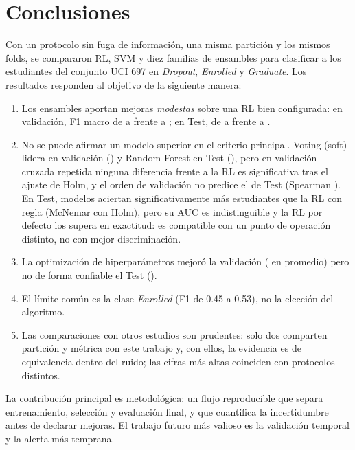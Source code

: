 \documentclass[conference]{IEEEtran}
\newcommand{\cD}{\emph{Dropout}}
\newcommand{\cE}{\emph{Enrolled}}
\newcommand{\cG}{\emph{Graduate}}
\newcommand{\Fm}{F1 macro}
\begin{document}
\section{Conclusiones}\label{sec:conc}
Con un protocolo sin fuga de información, una misma partición y los mismos folds, se compararon RL, SVM y diez familias de ensambles para clasificar a los estudiantes del conjunto UCI 697 en \cD, \cE{} y \cG. Los resultados responden al objetivo de la siguiente manera:
\begin{enumerate}
\item Los ensambles aportan mejoras \emph{modestas} sobre una RL bien configurada: en validación, \Fm{} de \cvFMinOpt{} a \cvFMaxOpt{} frente a \cvFLR{}; en Test, de \testFMin{} a \testFMax{} frente a \teFLR{}.
\item No se puede afirmar un modelo superior en el criterio principal. Voting (soft) lidera en validación (\cvFVS) y Random Forest en Test (\teFRF), pero en validación cruzada repetida ninguna diferencia frente a la RL es significativa tras el ajuste de Holm, y el orden de validación no predice el de Test (Spearman \rhoCVTest). En Test, \nMcnHolm{} modelos aciertan significativamente más estudiantes que la RL con regla (McNemar con Holm), pero su AUC es indistinguible y la RL por defecto los supera en exactitud: es compatible con un punto de operación distinto, no con mejor discriminación.
\item La optimización de hiperparámetros mejoró la validación (\dcvMedia{} en promedio) pero no de forma confiable el Test (\dteMedia{}).
\item El límite común es la clase \cE{} (F1 de 0.45 a 0.53), no la elección del algoritmo.
\item Las comparaciones con otros estudios son prudentes: solo dos comparten partición y métrica con este trabajo y, con ellos, la evidencia es de equivalencia dentro del ruido; las cifras más altas coinciden con protocolos distintos.
\end{enumerate}
La contribución principal es metodológica: un flujo reproducible que separa entrenamiento, selección y evaluación final, y que cuantifica la incertidumbre antes de declarar mejoras. El trabajo futuro más valioso es la validación temporal y la alerta más temprana.

\balance


\end{document}

